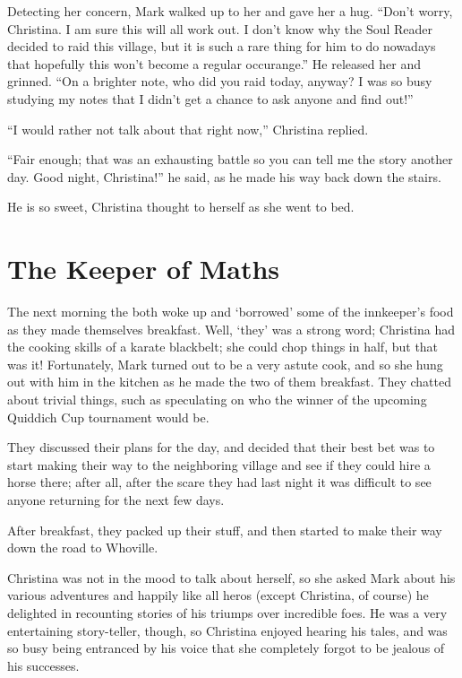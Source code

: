 \documentclass[showtrims,b6paper,draft,10pt]{memoir}
\begin{document}
Detecting her concern, Mark walked up to her and gave her a hug.  ``Don't worry, Christina.  I am sure this will all work out.  I don't know why the Soul Reader decided to raid this village, but it is such a rare thing for him to do nowadays that hopefully this won't become a regular occurange.''  He released her and grinned.  ``On a brighter note, who did you raid today, anyway?  I was so busy studying my notes that I didn't get a chance to ask anyone and find out!''

``I would rather not talk about that right now,'' Christina replied.

``Fair enough;  that was an exhausting battle so you can tell me the story another day.  Good night, Christina!''  he said, as he made his way back down the stairs.

He is so sweet, Christina thought to herself as she went to bed.

\timeskip
\chapter{The Keeper of Maths}

The next morning the both woke up and `borrowed' some of the innkeeper's food as they made themselves breakfast.  Well, `they' was a strong word;  Christina had the cooking skills of a karate blackbelt;  she could chop things in half, but that was it!  Fortunately, Mark turned out to be a very astute cook, and so she hung out with him in the kitchen as he made the two of them breakfast.  They chatted about trivial things, such as speculating on who the winner of the upcoming Quiddich Cup tournament would be.

They discussed their plans for the day, and decided that their best bet was to start making their way to the neighboring village and see if they could hire a horse there;  after all, after the scare they had last night it was difficult to see anyone returning for the next few days.

After breakfast, they packed up their stuff, and then started to make their way down the road to Whoville.

Christina was not in the mood to talk about herself, so she asked Mark about his various adventures and happily like all heros (except Christina, of course) he delighted in recounting stories of his triumps over incredible foes.  He was a very entertaining story-teller, though, so Christina enjoyed hearing his tales, and was so busy being entranced by his voice that she completely forgot to be jealous of his successes.
\end{document}
